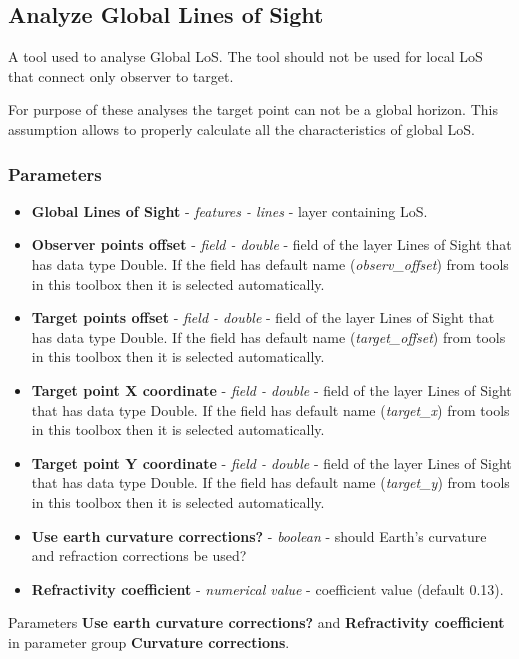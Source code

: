 \documentclass[]{article}
\begin{document}
\subsection{Analyze Global Lines of Sight}

A tool used to analyse Global LoS. The tool should not be used for local LoS that connect only observer to target.

For purpose of these analyses the target point can not be a global horizon. This assumption allows to properly calculate all the characteristics of global LoS.

\subsubsection{Parameters}
\begin{itemize}
	\item \textbf{Global Lines of Sight} - \textit{features - lines} - layer containing LoS.
	\item \textbf{Observer points offset} - \textit{field - double} - field of the layer Lines of Sight that has data type Double. If the field has default name (\textit{observ\_offset}) from tools in this toolbox then it is selected automatically.
	\item \textbf{Target points offset} - \textit{field - double} - field of the layer Lines of Sight that has data type Double. If the field has default name (\textit{target\_offset}) from tools in this toolbox then it is selected automatically.
	\item \textbf{Target point X coordinate} - \textit{field - double} - field of the layer Lines of Sight that has data type Double. If the field has default name (\textit{target\_x}) from tools in this toolbox then it is selected automatically.
	\item \textbf{Target point Y coordinate} - \textit{field - double} - field of the layer Lines of Sight that has data type Double. If the field has default name (\textit{target\_y}) from tools in this toolbox then it is selected automatically.
	\item \textbf{Use earth curvature corrections?} - \textit{boolean} - should Earth's curvature and refraction corrections be used?
	\item \textbf{Refractivity coefficient} - \textit{numerical value}  - coefficient value (default 0.13).
\end{itemize}

Parameters \textbf{Use earth curvature corrections?} and \textbf{Refractivity coefficient} in parameter group \textbf{Curvature corrections}.
\end{document}
